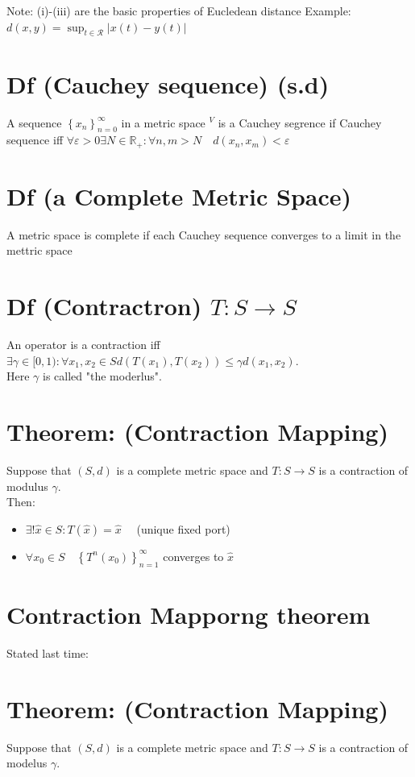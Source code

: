 \documentclass[10pt]{article}
\begin{document}
Note: (i)-(iii) are the basic properties of Eucledean distance Example: $d(x, y)=\sup _{t \in \mathcal{R}}|x(t)-y(t)|$

\section*{Df (Cauchey sequence) (s.d)}
A sequence $\left\{x_{n}\right\}_{n=0}^{\infty}$ in a metric space ${ }^{V}$ is a Cauchey segrence if Cauchey sequence iff $\forall \varepsilon>0 \exists N \in \mathbb{R}_{+}: \forall n, m>N \quad d\left(x_{n}, x_{m}\right)<\varepsilon$

\section*{Df (a Complete Metric Space)}
A metric space is complete if each Cauchey sequence converges to a limit in the mettric space

\section*{Df (Contractron) $T: S \rightarrow S$}
An operator is a contraction iff $\exists \gamma \in[0,1): \forall x_{1}, x_{2} \in S d\left(T\left(x_{1}\right), T\left(x_{2}\right)\right) \leqslant \gamma d\left(x_{1}, x_{2}\right)$.\\
Here $\gamma$ is called "the moderlus".

\section*{Theorem: (Contraction Mapping)}
Suppose that $(S, d)$ is a complete metric space and $T: S \rightarrow S$ is a contraction of modulus $\gamma$.\\
Then:

\begin{itemize}
  \item $\exists!\hat{x} \in S: T(\hat{x})=\hat{x} \quad$ (unique fixed port)
  \item $\forall x_{0} \in S \quad\left\{T^{n}\left(x_{0}\right)\right\}_{n=1}^{\infty}$ converges to $\hat{x}$
\end{itemize}

\section*{Contraction Mapporng theorem}
Stated last time:

\section*{Theorem: (Contraction Mapping)}
Suppose that $(S, d)$ is a complete metric space and $T: S \rightarrow S$ is a contraction of modelus $\gamma$.
\end{document}
